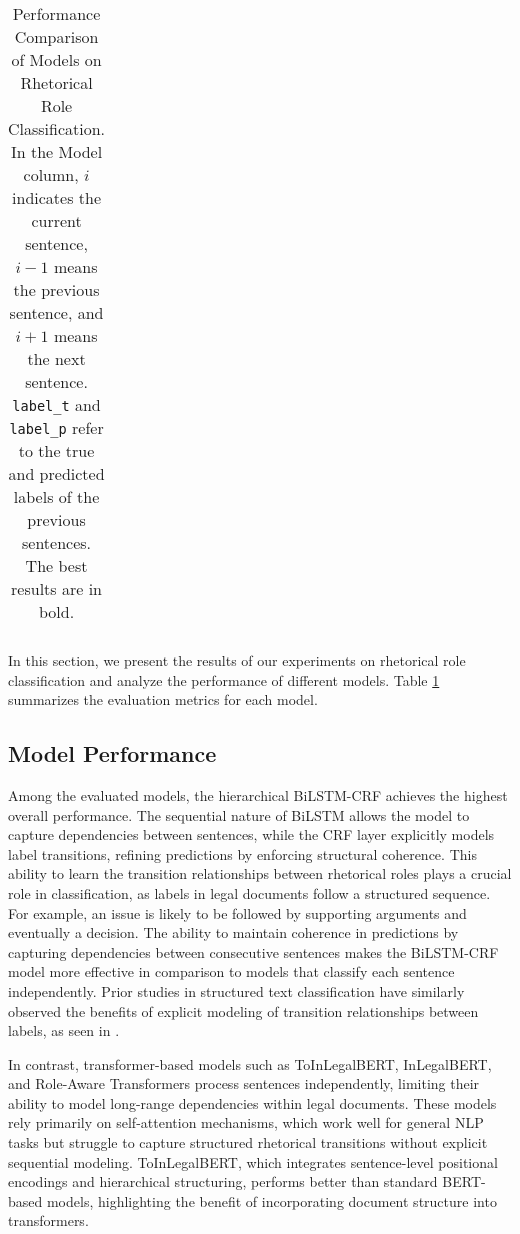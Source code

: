 \begin{table}[t]
{\begin{tabular}{lccccc}
\bottomrule
\end{tabular}
}
\caption{Performance Comparison of Models on Rhetorical Role Classification. In the Model column, \(i\) indicates the current sentence, \(i-1\) means the previous sentence, and \(i+1\) means the next sentence. \texttt{label\_t} and \texttt{label\_p} refer to the true and predicted labels of the previous sentences. The best results are in bold.}
\label{tab:model_performance}
\end{table}

In this section, we present the results of our experiments on rhetorical role classification and analyze the performance of different models. Table \ref{tab:model_performance} summarizes the evaluation metrics for each model.

\subsection{Model Performance}
Among the evaluated models, the hierarchical BiLSTM-CRF achieves the highest overall performance. The sequential nature of BiLSTM allows the model to capture dependencies between sentences, while the CRF layer explicitly models label transitions, refining predictions by enforcing structural coherence. This ability to learn the transition relationships between rhetorical roles plays a crucial role in classification, as labels in legal documents follow a structured sequence. For example, an issue is likely to be followed by supporting arguments and eventually a decision. The ability to maintain coherence in predictions by capturing dependencies between consecutive sentences makes the BiLSTM-CRF model more effective in comparison to models that classify each sentence independently. Prior studies in structured text classification have similarly observed the benefits of explicit modeling of transition relationships between labels, as seen in \citet{bhattacharya2019identification, modi-etal-2023-semeval, santosh2024hiculr}.

In contrast, transformer-based models such as ToInLegalBERT, InLegalBERT, and Role-Aware Transformers process sentences independently, limiting their ability to model long-range dependencies within legal documents. These models rely primarily on self-attention mechanisms, which work well for general NLP tasks but struggle to capture structured rhetorical transitions without explicit sequential modeling. ToInLegalBERT, which integrates sentence-level positional encodings and hierarchical structuring, performs better than standard BERT-based models, highlighting the benefit of incorporating document structure into transformers.

